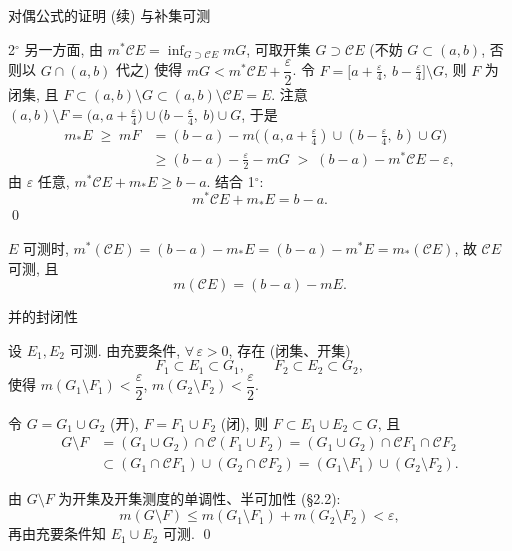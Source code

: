 
\begin{frame}{对偶公式的证明 (续) 与补集可测}

2$^\circ$
另一方面, 由 $m^* \mathscr{C}E = \inf_{G \supset \mathscr{C}E} mG$, 可取开集 $G \supset \mathscr{C}E$ (不妨 $G \subset (a,b)$, 否则以 $G \cap (a,b)$ 代之) 使得 $mG < m^* \mathscr{C}E + \dfrac{\varepsilon}{2}$. 令 $F = \big[ a + \tfrac{\varepsilon}{4},\ b - \tfrac{\varepsilon}{4} \big] \setminus G$, 则 $F$ 为闭集, 且 $F \subset (a,b) \setminus G \subset (a,b) \setminus \mathscr{C}E = E$. 注意 $(a,b) \setminus F = \big(a, a + \tfrac{\varepsilon}{4}\big) \cup \big(b - \tfrac{\varepsilon}{4},\ b\big) \cup G$, 于是
\begin{align*}
m_* E \;\geqslant\; mF
&= (b - a) - m\big( (a, a + \tfrac{\varepsilon}{4}) \cup (b - \tfrac{\varepsilon}{4},\ b) \cup G \big)\\
&\geqslant (b - a) - \frac{\varepsilon}{2} - mG
\;>\; (b - a) - m^* \mathscr{C}E - \varepsilon ,
\end{align*}
由 $\varepsilon$ 任意, $m^* \mathscr{C}E + m_* E \geqslant b - a$. 结合 1$^\circ$:
\[
m^* \mathscr{C}E + m_* E = b - a .
\]
\qed

\pause

\begin{cor}[补集可测]
$E$ 可测时, $m^* (\mathscr{C}E) = (b - a) - m_* E = (b - a) - m^* E = m_* (\mathscr{C}E)$, 故 $\mathscr{C}E$ 可测, 且
\[
m(\mathscr{C}E) = (b - a) - mE .
\]
\end{cor}

\end{frame}


\begin{frame}{并的封闭性}

设 $E_1, E_2$ 可测. 由充要条件, $\forall\, \varepsilon > 0$, 存在 (闭集、开集)
\[
F_1 \subset E_1 \subset G_1, \qquad F_2 \subset E_2 \subset G_2,
\]
使得 $m(G_1 \setminus F_1) < \dfrac{\varepsilon}{2}$, $m(G_2 \setminus F_2) < \dfrac{\varepsilon}{2}$.

\pause

令 $G = G_1 \cup G_2$ (开), $F = F_1 \cup F_2$ (闭), 则 $F \subset E_1 \cup E_2 \subset G$, 且
\begin{align*}
G \setminus F
&= (G_1 \cup G_2) \cap \mathscr{C}(F_1 \cup F_2)
= (G_1 \cup G_2) \cap \mathscr{C}F_1 \cap \mathscr{C}F_2 \\
&\subset (G_1 \cap \mathscr{C}F_1) \cup (G_2 \cap \mathscr{C}F_2)
= (G_1 \setminus F_1) \cup (G_2 \setminus F_2).
\end{align*}

\pause

由 $G \setminus F$ 为开集及开集测度的单调性、半可加性 (§2.2):
\[
m(G \setminus F) \leqslant m(G_1 \setminus F_1) + m(G_2 \setminus F_2) < \varepsilon ,
\]
再由充要条件知 $E_1 \cup E_2$ 可测.
\qed

\end{frame}

